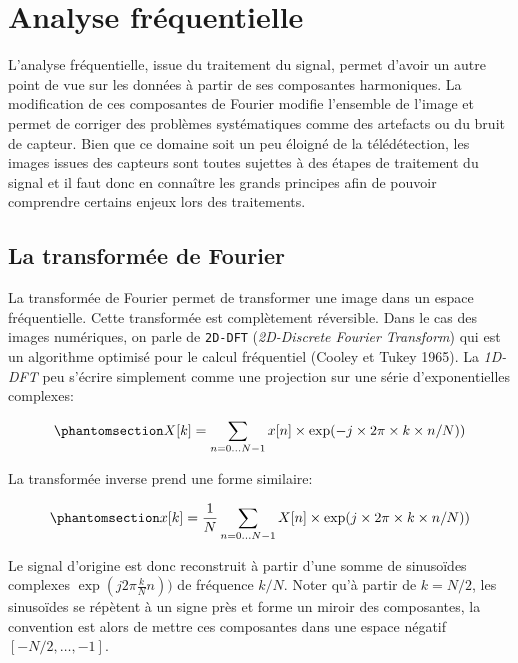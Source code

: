 \documentclass[
  french,
  11pt,
  letterpaper,
  open=any,
  twoside=false,
  french]{scrbook}
\begin{document}
\section{Analyse fréquentielle}\label{analyse-fruxe9quentielle}

L'analyse fréquentielle, issue du traitement du signal, permet d'avoir
un autre point de vue sur les données à partir de ses composantes
harmoniques. La modification de ces composantes de Fourier modifie
l'ensemble de l'image et permet de corriger des problèmes systématiques
comme des artefacts ou du bruit de capteur. Bien que ce domaine soit un
peu éloigné de la télédétection, les images issues des capteurs sont
toutes sujettes à des étapes de traitement du signal et il faut donc en
connaître les grands principes afin de pouvoir comprendre certains
enjeux lors des traitements.

\subsection{La transformée de
Fourier}\label{la-transformuxe9e-de-fourier}

La transformée de Fourier permet de transformer une image dans un espace
fréquentielle. Cette transformée est complètement réversible. Dans le
cas des images numériques, on parle de \texttt{2D-DFT}
(\emph{2D-Discrete Fourier Transform}) qui est un algorithme optimisé
pour le calcul fréquentiel (Cooley et Tukey 1965). La \emph{1D-DFT} peu
s'écrire simplement comme une projection sur une série d'exponentielles
complexes:

\begin{equation}\protect\phantomsection\label{eq-dft}{X[k] = \sum_{n=0 \ldots N-1} x[n] \times \exp(-j \times 2\pi \times k \times n/N))}\end{equation}

La transformée inverse prend une forme similaire:

\begin{equation}\protect\phantomsection\label{eq-idft}{x[k] = \frac{1}{N}\sum_{n=0 \ldots N-1} X[n] \times \exp(j \times 2\pi \times k \times n/N))}\end{equation}

Le signal d'origine est donc reconstruit à partir d'une somme de
sinusoïdes complexes \(\exp(j2\pi \frac{k}{N}n))\) de fréquence \(k/N\).
Noter qu'à partir de \(k=N/2\), les sinusoïdes se répètent à un signe
près et forme un miroir des composantes, la convention est alors de
mettre ces composantes dans une espace négatif \([-N/2,\ldots,-1]\).
\end{document}
